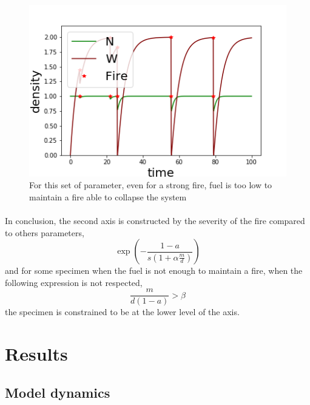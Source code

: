 \documentclass{article}
\begin{document}
\begin{figure}[h!]
\centering
\includegraphics[width=12cm]{return_never_1.png}
\caption{For this set of parameter, even for a strong fire, fuel is too low to maintain a fire able to collapse the system}
\end{figure}

\paragraph{}
In conclusion, the second axis is constructed by the severity of the fire compared to others parameters, 
\[
\exp(-\frac{1-a}{s(1+\alpha\frac{m}{d})})
\]
and for some specimen when the fuel is not enough to maintain a fire, when the following expression is not respected,
\[
\frac{m}{d( 1-a)} > \beta
\]
the specimen is constrained to be at the lower level of the axis.


\newpage

\section{Results}

\subsection{Model dynamics}


\end{document}

